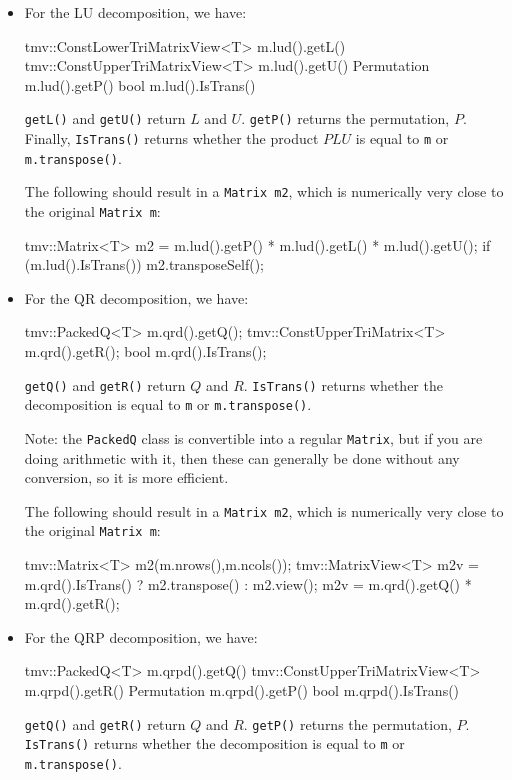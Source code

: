 \documentclass[twoside,letterpaper,11pt]{article}
\renewcommand{\tt}[1]{{\lstinline {#1}}}
\begin{document}
\begin{itemize}
\item
For the LU decomposition, we have:
\begin{tmvcode}
tmv::ConstLowerTriMatrixView<T> m.lud().getL()
tmv::ConstUpperTriMatrixView<T> m.lud().getU()
Permutation m.lud().getP()
bool m.lud().IsTrans()
\end{tmvcode}
\tt{getL()} and \tt{getU()} return $L$ and $U$.
\tt{getP()} returns the permutation, $P$.
Finally, \tt{IsTrans()} returns whether
the product $PLU$ is equal to \tt{m} or \tt{m.transpose()}.  

The following should result in a \tt{Matrix m2}, which is numerically very close to
the original \tt{Matrix m}:
\begin{tmvcode}
tmv::Matrix<T> m2 = m.lud().getP() * m.lud().getL() * m.lud().getU();
if (m.lud().IsTrans()) m2.transposeSelf();
\end{tmvcode}

\item
For the QR decomposition, we have:
\begin{tmvcode}
tmv::PackedQ<T> m.qrd().getQ();
tmv::ConstUpperTriMatrix<T> m.qrd().getR();
bool m.qrd().IsTrans();
\end{tmvcode}
\tt{getQ()} and \tt{getR()} return $Q$ and $R$.  
\tt{IsTrans()} returns whether
the decomposition is equal to \tt{m} or \tt{m.transpose()}.  

Note: the \tt{PackedQ} class is convertible into a regular \tt{Matrix}, but if you are doing 
arithmetic with it, then these can generally be done without any conversion,
so it is more efficient.

The following should result in a \tt{Matrix m2}, which is numerically very close to
the original \tt{Matrix m}:
\begin{tmvcode}
tmv::Matrix<T> m2(m.nrows(),m.ncols());
tmv::MatrixView<T> m2v = 
      m.qrd().IsTrans() ? m2.transpose() : m2.view();
m2v = m.qrd().getQ() * m.qrd().getR();
\end{tmvcode}

\item
For the QRP decomposition, we have:
\begin{tmvcode}
tmv::PackedQ<T> m.qrpd().getQ()
tmv::ConstUpperTriMatrixView<T> m.qrpd().getR()
Permutation m.qrpd().getP()
bool m.qrpd().IsTrans()
\end{tmvcode}
\tt{getQ()} and \tt{getR()} return $Q$ and $R$.
\tt{getP()} returns the permutation, $P$.
\tt{IsTrans()} returns whether
the decomposition is equal to \tt{m} or \tt{m.transpose()}.  


\end{itemize}
\end{document}
